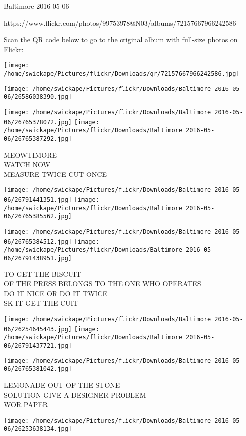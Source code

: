 \documentclass[10pt,letterpaper]{article}
\begin{document}
Baltimore 2016-05-06

https://www.flickr.com/photos/99753978@N03/albums/72157667966242586

Scan the QR code below to go to the original album with full-size photos on Flickr:

\texttt{[image: /home/swickape/Pictures/flickr/Downloads/qr/72157667966242586.jpg]}
\pagebreak

\texttt{[image: /home/swickape/Pictures/flickr/Downloads/Baltimore 2016-05-06/26586038390.jpg]}

\vspace{0.25in}
\texttt{[image: /home/swickape/Pictures/flickr/Downloads/Baltimore 2016-05-06/26765378072.jpg]}
\texttt{[image: /home/swickape/Pictures/flickr/Downloads/Baltimore 2016-05-06/26765387292.jpg]}

MEOWTIMORE\\
WATCH NOW\\
MEASURE TWICE CUT ONCE
\pagebreak

\texttt{[image: /home/swickape/Pictures/flickr/Downloads/Baltimore 2016-05-06/26791441351.jpg]}
\texttt{[image: /home/swickape/Pictures/flickr/Downloads/Baltimore 2016-05-06/26765385562.jpg]}

\texttt{[image: /home/swickape/Pictures/flickr/Downloads/Baltimore 2016-05-06/26765384512.jpg]}
\texttt{[image: /home/swickape/Pictures/flickr/Downloads/Baltimore 2016-05-06/26791438951.jpg]}

TO GET THE BISCUIT\\
OF THE PRESS BELONGS TO THE ONE WHO OPERATES\\
DO IT NICE OR DO IT TWICE\\
SK IT GET THE CUIT
\pagebreak

\texttt{[image: /home/swickape/Pictures/flickr/Downloads/Baltimore 2016-05-06/26254645443.jpg]}
\texttt{[image: /home/swickape/Pictures/flickr/Downloads/Baltimore 2016-05-06/26791437721.jpg]}

\texttt{[image: /home/swickape/Pictures/flickr/Downloads/Baltimore 2016-05-06/26765381042.jpg]}

LEMONADE OUT OF THE STONE\\
SOLUTION GIVE A DESIGNER PROBLEM\\
WOR PAPER
\pagebreak

\texttt{[image: /home/swickape/Pictures/flickr/Downloads/Baltimore 2016-05-06/26253638134.jpg]}
\end{document}
